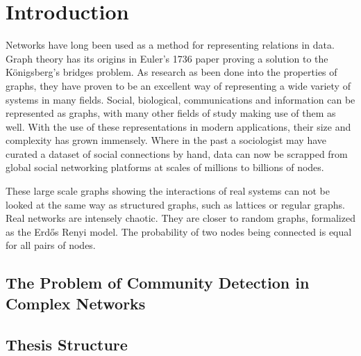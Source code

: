 \chapter{Introduction}
\label{ch:intro:introduction}
Networks have long been used as a method for representing relations in data. Graph theory has its origins in Euler's 1736 paper proving a solution to the K\"{o}nigsberg's bridges problem. As research as been done into the properties of graphs, they have proven to be an excellent way of representing a wide variety of systems in many fields. Social, biological, communications and information can be represented as graphs, with many other fields of study making use of them as well. With the use of these representations in modern applications, their size and complexity has grown immensely. Where in the past a sociologist may have curated a dataset of social connections by hand, data can now be scrapped from global social networking platforms at scales of millions to billions of nodes. 

These large scale graphs showing the interactions of real systems can not be looked at the same way as structured graphs, such as lattices or regular graphs. Real networks are intensely chaotic. They are closer to random graphs, formalized as the Erd\H{o}s Renyi model. The probability of two nodes being connected is equal for all pairs of nodes. 

\section{The Problem of Community Detection in \\Complex Networks}

\section{Thesis Structure}